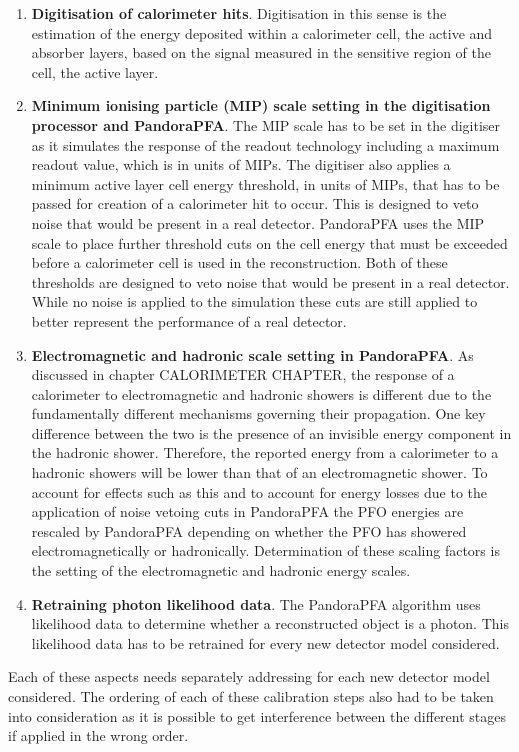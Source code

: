 \begin{enumerate}
\item \textbf{Digitisation of calorimeter hits}.  Digitisation in this sense is the estimation of the energy deposited within a calorimeter cell, the active and absorber layers, based on the signal measured in the sensitive region of the cell, the active layer.  
\item \textbf{Minimum ionising particle (MIP) scale setting in the digitisation processor and PandoraPFA}.  The MIP scale has to be set in the digitiser as it simulates the response of the readout technology including a maximum readout value, which is in units of MIPs.  The digitiser also applies a minimum active layer cell energy threshold, in units of MIPs, that has to be passed for creation of a calorimeter hit to occur.  This is designed to veto noise that would be present in a real detector.  PandoraPFA uses the MIP scale to place further threshold cuts on the cell energy that must be exceeded before a calorimeter cell is used in the reconstruction.  Both of these thresholds are designed to veto noise that would be present in a real detector.  While no noise is applied to the simulation these cuts are still applied to better represent the performance of a real detector. 
\item \textbf{Electromagnetic and hadronic scale setting in PandoraPFA}.  As discussed in chapter CALORIMETER CHAPTER, the response of a calorimeter to electromagnetic and hadronic showers is different due to the fundamentally different mechanisms governing their propagation.  One key difference between the two is the presence of an invisible energy component in the hadronic shower.  Therefore, the reported energy from a calorimeter to a hadronic showers will be lower than that of an electromagnetic shower.  To account for effects such as this and to account for energy losses due to the application of noise vetoing cuts in PandoraPFA the PFO energies are rescaled by PandoraPFA depending on whether the PFO has showered electromagnetically or hadronically.  Determination of these scaling factors is the setting of the electromagnetic and hadronic energy scales.  
\item \textbf{Retraining photon likelihood data}.  The PandoraPFA algorithm uses likelihood data to determine whether a reconstructed object is a photon.  This likelihood data has to be retrained for every new detector model considered. 
\end{enumerate}

Each of these aspects needs separately addressing for each new detector model considered.  The ordering of each of these calibration steps also had to be taken into consideration as it is possible to get interference between the different stages if applied in the wrong order.  

